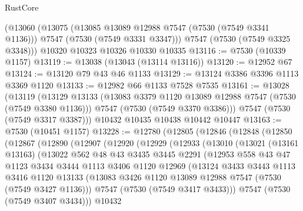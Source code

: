 \begin{lexlean}{RustCore}
\begin{coremodule}
    (@13060
      (@13075
        (@13085 @13089 @12988 @7547 (@7530 (@7549 @3341 @1136)))
        @7547
        (@7530 (@7549 @3331 @3347)))
      @7547
      (@7530 (@7549 @3325 @3348)))
    @10320
    @10323
    @10326
    @10330
    @10335
@13116 := @7530 (@10339 @1157)
@13119 := @13038 (@13043 (@13114 @13116))
@13120 := @12952 @67
@13124 := @13120 @79 @43 @46 @1133
@13129 := @13124 @3386 @3396 @1113 @3369 @1120
@13133 := @12982 @66 @1133 @7528 @7535
@13161 := @13028
    (@13119
      (@13129
        @13133
        (@13083 @3379 @1120 @13089 @12988 @7547 (@7530 (@7549 @3380 @1136)))
        @7547
        (@7530 (@7549 @3370 @3386)))
      @7547
      (@7530 (@7549 @3317 @3387)))
    @10432
    @10435
    @10438
    @10442
    @10447
@13163 := @7530 (@10451 @1157)
@13228 := @12780
    (@12805
      (@12846
        (@12848
          (@12850
            (@12867
              (@12890
                (@12907
                  (@12920
                    (@12929
                      (@12933
                        (@13010
                          (@13021
                            (@13161 @13163)
                            (@13022
                              @562
                              @48
                              @43
                              @3435
                              @3445
                              @2291
                              (@12953
                                @558
                                @43
                                @47
                                @1123
                                @3434
                                @3444
                                @1113
                                @3406
                                @1120
                                @12969
                                (@13124
                                  @3433
                                  @3443
                                  @1113
                                  @3416
                                  @1120
                                  @13133
                                  (@13083
                                    @3426
                                    @1120
                                    @13089
                                    @12988
                                    @7547
                                    (@7530 (@7549 @3427 @1136)))
                                  @7547
                                  (@7530 (@7549 @3417 @3433)))
                                @7547
                                (@7530 (@7549 @3407 @3434)))
                              @10432

\end{coremodule}
\end{lexlean}

